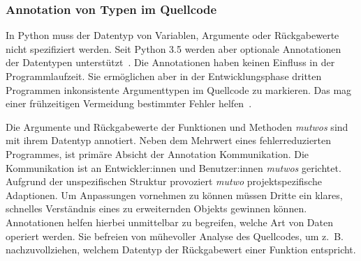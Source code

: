 \documentclass[12pt,a4paper,ngerman]{article}
\begin{document}


\subsubsection{Annotation von Typen im Quellcode}
\label{typeAnnotations}

In Python muss der Datentyp von Variablen, Argumente oder Rückgabewerte nicht spezifiziert werden.
Seit Python 3.5 werden aber optionale Annotationen der Datentypen unterstützt~\parencite{typingModuleDocumentation}.
Die Annotationen haben keinen Einfluss in der Programmlaufzeit.
Sie ermöglichen aber in der Entwicklungsphase dritten Programmen inkonsistente Argumenttypen im Quellcode zu markieren.
%
Das mag einer frühzeitigen Vermeidung bestimmter Fehler helfen~\parencite{typeHintPep}.

\bigskip

Die Argumente und Rückgabewerte der Funktionen und Methoden \emph{mutwos} sind mit ihrem Datentyp annotiert.
Neben dem Mehrwert eines fehlerreduzierten Programmes, ist primäre Absicht der Annotation Kommunikation.
Die Kommunikation ist an Entwickler:innen und Benutzer:innen \emph{mutwos} gerichtet.
Aufgrund der unspezifischen Struktur provoziert \emph{mutwo} projektspezifische Adaptionen.
Um Anpassungen vornehmen zu können müssen Dritte ein klares, schnelles Verständnis eines zu erweiternden Objekts gewinnen können.
Annotationen helfen hierbei unmittelbar zu begreifen, welche Art von Daten operiert werden.
Sie befreien von mühevoller Analyse des Quellcodes, um z.~B. nachzuvollziehen, welchem Datentyp der Rückgabewert einer Funktion entspricht.
\end{document}
